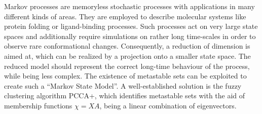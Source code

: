 	Markov processes are memoryless stochastic processes with applications in many different kinds of areas.
	They are employed to describe molecular systems like protein folding or ligand-binding processes.
	Such processes act on very large state spaces and additionally require simulations on rather long time-scales in order to observe rare conformational changes. %
	Consequently, a reduction of dimension is aimed at, which can be realized by a projection onto a smaller state space. %
	The reduced model should represent the correct long-time behaviour of the process, while being less complex. %
	The existence of metastable sets can be exploited to create such a ``Markov State Model''. %
	A well-established solution is the  fuzzy clustering algorithm PCCA+, which identifies metastable sets with the aid of membership functions $\chi = XA$, being a linear combination of eigenvectors. %
\\

